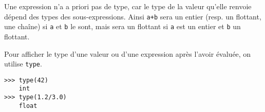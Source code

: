 Une expression n'a a priori pas de type, car le type de la valeur qu'elle renvoie dépend des types 
des sous-expressions. Ainsi \texttt{a+b} sera un entier (resp. un flottant, une chaîne) si 
\texttt{a} et \texttt{b} le sont, mais sera un flottant si \texttt{a} est un entier et \texttt{b} 
un flottant.


Pour afficher le type d'une valeur ou d'une expression après l'avoir évaluée, on utilise 
\texttt{type}.
\begin{lstlisting}
>>> type(42)
	int
>>> type(1.2/3.0)
	float
\end{lstlisting}





